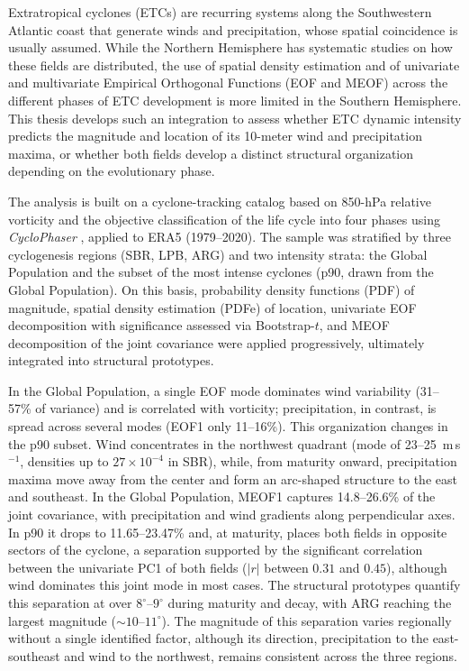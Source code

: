 Extratropical cyclones (ETCs) are recurring systems along the Southwestern Atlantic coast that generate winds and precipitation, whose spatial coincidence is usually assumed.
While the Northern Hemisphere has systematic studies on how these fields are distributed, the use of spatial density estimation and of univariate and multivariate Empirical Orthogonal Functions (EOF and MEOF) across the different phases of ETC development is more limited in the Southern Hemisphere.
This thesis develops such an integration to assess whether ETC dynamic intensity predicts the magnitude and location of its 10-meter wind and precipitation maxima, or whether both fields develop a distinct structural organization depending on the evolutionary phase.

The analysis is built on a cyclone-tracking catalog based on 850-hPa relative vorticity \citep{gramcianinov2020analysis} and the objective classification of the life cycle into four phases using \textit{CycloPhaser} \citep{coutodesouza2024new, deSouza2025CycloPhaser}, applied to ERA5 (1979--2020).
The sample was stratified by three cyclogenesis regions (SBR, LPB, ARG) and two intensity strata: the Global Population and the subset of the most intense cyclones (p90, drawn from the Global Population).
On this basis, probability density functions (PDF) of magnitude, spatial density estimation (PDFe) of location, univariate EOF decomposition with significance assessed via Bootstrap-$t$, and MEOF decomposition of the joint covariance were applied progressively, ultimately integrated into structural prototypes.

In the Global Population, a single EOF mode dominates wind variability (31--57\% of variance) and is correlated with vorticity; precipitation, in contrast, is spread across several modes (EOF1 only 11--16\%).
This organization changes in the p90 subset. Wind concentrates in the northwest quadrant (mode of 23--25~m\,s$^{-1}$, densities up to $27\times10^{-4}$ in SBR), while, from maturity onward, precipitation maxima move away from the center and form an arc-shaped structure to the east and southeast.
In the Global Population, MEOF1 captures 14.8--26.6\% of the joint covariance, with precipitation and wind gradients along perpendicular axes. In p90 it drops to 11.65--23.47\% and, at maturity, places both fields in opposite sectors of the cyclone, a separation supported by the significant correlation between the univariate PC1 of both fields ($|r|$ between $0.31$ and $0.45$), although wind dominates this joint mode in most cases.
The structural prototypes quantify this separation at over $8^{\circ}$--$9^{\circ}$ during maturity and decay, with ARG reaching the largest magnitude (${\sim}10$--$11^{\circ}$).
The magnitude of this separation varies regionally without a single identified factor, although its direction, precipitation to the east-southeast and wind to the northwest, remains consistent across the three regions.

